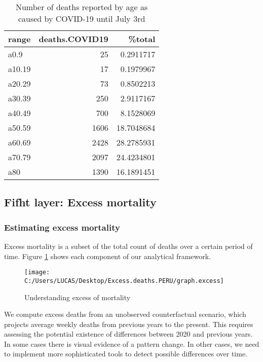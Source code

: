 \documentclass[
]{article}
\begin{document}
\begin{table}[!h]

\caption{\label{tab:covidage}Number of deaths reported by age as caused by COVID-19 until July 3rd}
\centering
\begin{tabular}[t]{lrr}
\toprule
range & deaths.COVID19 & \%total\\
\midrule
a0.9 & 25 & 0.2911717\\
a10.19 & 17 & 0.1979967\\
a20.29 & 73 & 0.8502213\\
a30.39 & 250 & 2.9117167\\
a40.49 & 700 & 8.1528069\\
\addlinespace
a50.59 & 1606 & 18.7048684\\
a60.69 & 2428 & 28.2785931\\
a70.79 & 2097 & 24.4234801\\
a80 & 1390 & 16.1891451\\
\bottomrule
\end{tabular}
\end{table}

\hypertarget{fifht-layer-excess-mortality}{%
\subsection{Fifht layer: Excess mortality}\label{fifht-layer-excess-mortality}}

\hypertarget{estimating-excess-mortality}{%
\subsubsection{Estimating excess mortality}\label{estimating-excess-mortality}}

Excess mortality is a subset of the total count of deaths over a certain period of time. Figure \ref{fig:excess} shows each component of our analytical framework.

\begin{figure}[H]
\texttt{[image: C:/Users/LUCAS/Desktop/Excess.deaths.PERU/graph.excess]} \caption{Understanding excess of mortality}\label{fig:excess}
\end{figure}

We compute excess deaths from an unobserved counterfactual scenario, which projects average weekly deaths from previous years to the present. This requires assessing the potential existence of differences between 2020 and previous years. In some cases there is visual evidence of a pattern change. In other cases, we need to implement more sophisticated tools to detect possible differences over time.
\end{document}
